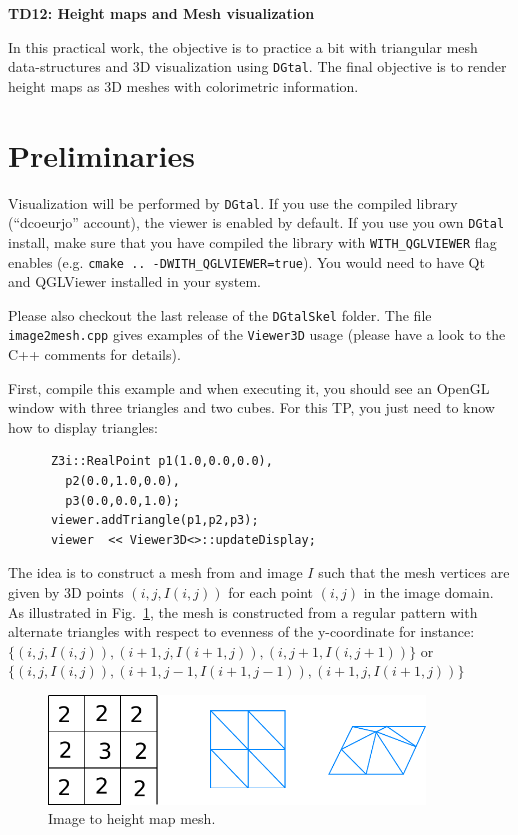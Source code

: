 \documentclass[a4paper, 11pt]{article}
\title{}
\author{}
\date{}
\begin{document}
\begin{center}
	\LARGE \textbf{TD12: Height maps and Mesh visualization}
\end{center}

\bigskip
\par In this practical work, the objective is to practice a bit with
triangular mesh data-structures and 3D visualization using
\texttt{DGtal}. The final objective is to render height maps as 3D
meshes with colorimetric information.

\section{Preliminaries}

Visualization will be performed by \texttt{DGtal}. If you use the
compiled library (``dcoeurjo'' account), the viewer is enabled by
default. If you use you own \texttt{DGtal} install, make sure that you
have compiled the library with \texttt{WITH\_QGLVIEWER} flag enables
(e.g. \texttt{cmake .. -DWITH\_QGLVIEWER=true}). You would need to
have Qt and QGLViewer installed in your system.

Please also checkout the last release of the \texttt{DGtalSkel} folder. The
file \texttt{image2mesh.cpp} gives examples of the \texttt{Viewer3D}
usage (please have a look to the C++ comments for details).

First, compile this example and when executing it, you should see an OpenGL
window with three triangles and two cubes.  For this TP, you just need
to know how to display triangles:
\begin{verbatim}
      Z3i::RealPoint p1(1.0,0.0,0.0),
        p2(0.0,1.0,0.0),
        p3(0.0,0.0,1.0);
      viewer.addTriangle(p1,p2,p3);
      viewer  << Viewer3D<>::updateDisplay;
\end{verbatim}


The idea is to construct a mesh from and image $I$ such that the mesh
vertices are given by 3D points $(i,j, I(i,j))$ for each point $(i,j)$
in the image domain.  As illustrated in Fig.~\ref{fig:image}, the mesh
is constructed from a regular pattern with alternate triangles with
respect to evenness of the y-coordinate for instance: $\{(i,j,I(i,j)),
(i+1,j,I(i+1,j)), (i,j+1,I(i,j+1))\}$ or $\{(i,j,I(i,j)),
(i+1,j-1,I(i+1,j-1)), (i+1,j,I(i+1,j))\}$

\begin{figure}[h]
  \begin{center}
    \includegraphics[width=10cm]{image2mesh}
  \end{center}
  \caption{Image to height map mesh.}
  \label{fig:image}
\end{figure}
\end{document}
